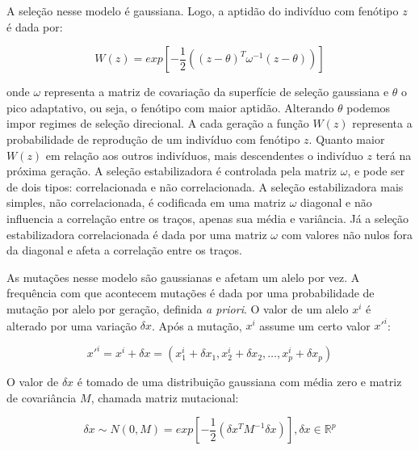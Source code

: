 A seleção nesse modelo é gaussiana.
Logo, a aptidão do indivíduo com fenótipo $z$ é dada por:

\begin{equation}
W(z) = exp \left[-\frac{1}{2} ((z-\theta)^T \omega^{-1} (z-\theta))\right] 
\label{selecao}
\end{equation}

onde $\omega$ representa a matriz de covariação da superfície de seleção
gaussiana e $\theta$ o pico adaptativo, ou seja, o fenótipo com maior
aptidão.
Alterando $\theta$ podemos impor regimes de seleção direcional.
A cada geração a função $W(z)$ representa a probabilidade de reprodução
de um indivíduo com fenótipo $z$.
Quanto maior $W(z)$ em relação aos outros indivíduos, mais descendentes
o indivíduo $z$ terá na próxima geração.
A seleção estabilizadora é controlada pela matriz $\omega$, e
pode ser de dois tipos: correlacionada e não correlacionada.
A seleção estabilizadora mais simples, não correlacionada, é codificada
em uma matriz $\omega$ diagonal e não influencia a correlação entre os
traços, apenas sua média e variância.
Já a seleção estabilizadora correlacionada é dada por uma matriz
$\omega$ com valores não nulos fora da diagonal e afeta a correlação
entre os traços. 

As mutações nesse modelo são gaussianas e afetam um alelo por vez.
A frequência com que acontecem mutações é dada por uma probabilidade de
mutação por alelo por geração, definida {\it a priori}.
O valor de um alelo $x^i$ é alterado por uma variação $ \delta x$.
Após a mutação, $x^i$ assume um certo valor $x'^i$:

\begin{equation}
x'^i = x^i + \delta x = ( x^i_1 + \delta x_1, x^i_2 + \delta x_2,\ldots, x^i_p + \delta x_p)
\end{equation}

O valor de $\delta x$ é tomado de uma distribuição gaussiana com média
zero e matriz de covariância $M$, chamada matriz mutacional:

\begin{equation}
\delta x \sim N(0, M) = exp \left[-\frac{1}{2} (\delta x^T M^{-1} \delta x)\right] , \delta x \in \mathbb{R}^p
\end{equation}

